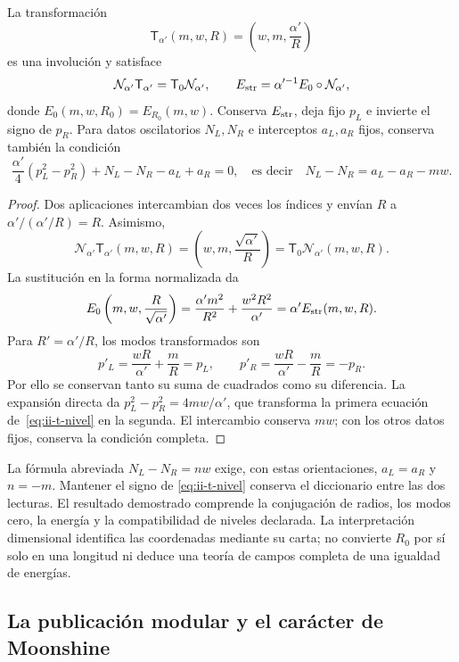 \begin{theorem}
\label{thm:ii-t-cuerda}
La transformación
\[
 \mathsf T_{\alpha'}(m,w,R)=\left(w,m,\frac{\alpha'}R\right)
\]
es una involución y satisface
\begin{equation}
 \mathcal N_{\alpha'}\mathsf T_{\alpha'}
 =\mathsf T_0\mathcal N_{\alpha'},\qquad
 E_{\rm str}=\alpha'^{-1}E_0\circ\mathcal N_{\alpha'},
 \label{eq:ii-t-normalizacion}
\end{equation}
donde \(E_0(m,w,R_0)=E_{R_0}(m,w)\). Conserva \(E_{\rm str}\),
deja fijo \(p_L\) e invierte el signo de \(p_R\). Para datos
oscilatorios \(N_L,N_R\) e interceptos \(a_L,a_R\) fijos,
conserva también la condición
\begin{equation}
 \frac{\alpha'}4(p_L^2-p_R^2)+N_L-N_R-a_L+a_R=0,
 \quad\text{es decir}\quad
 N_L-N_R=a_L-a_R-mw.
 \label{eq:ii-t-nivel}
\end{equation}
\end{theorem}

\begin{proof}
Dos aplicaciones intercambian dos veces los índices y envían
\(R\) a \(\alpha'/(\alpha'/R)=R\). Asimismo,
\[
 \mathcal N_{\alpha'}\mathsf T_{\alpha'}(m,w,R)
 =\left(w,m,\frac{\sqrt{\alpha'}}R\right)
 =\mathsf T_0\mathcal N_{\alpha'}(m,w,R).
\]
La sustitución en la forma normalizada da
\[
 E_0\left(m,w,\frac R{\sqrt{\alpha'}}\right)
 =\frac{\alpha'm^2}{R^2}+\frac{w^2R^2}{\alpha'}
 =\alpha'E_{\rm str}(m,w,R).
\]
Para \(R'=\alpha'/R\), los modos transformados son
\[
 p'_L=\frac{wR}{\alpha'}+\frac mR=p_L,\qquad
 p'_R=\frac{wR}{\alpha'}-\frac mR=-p_R.
\]
Por ello se conservan tanto su suma de cuadrados como su diferencia.
La expansión directa da \(p_L^2-p_R^2=4mw/\alpha'\), que
transforma la primera ecuación de~\eqref{eq:ii-t-nivel} en la segunda.
El intercambio conserva \(mw\); con los otros datos fijos, conserva
la condición completa.
\end{proof}

La fórmula abreviada \(N_L-N_R=nw\) exige, con estas orientaciones,
\(a_L=a_R\) y \(n=-m\). Mantener el signo de
\eqref{eq:ii-t-nivel} conserva el diccionario entre las dos lecturas.
El resultado demostrado comprende la conjugación de radios, los modos
cero, la energía y la compatibilidad de niveles declarada. La interpretación
dimensional identifica las coordenadas mediante su carta; no convierte
\(R_0\) por sí solo en una longitud ni deduce una teoría de campos
completa de una igualdad de energías.

\subsection{La publicación modular y el carácter de Moonshine}

